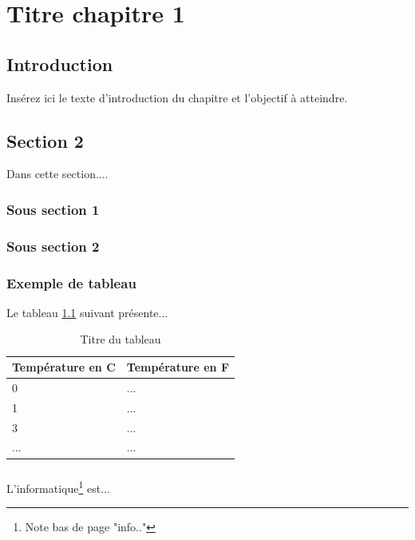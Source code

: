 \chapter{Titre chapitre 1}

\section{Introduction}
Insérez ici le texte d’introduction du chapitre et l’objectif à atteindre.



\section{Section 2}
Dans cette section....
\subsection{Sous section 1}

\subsection{Sous section 2}
\subsection{Exemple de tableau}
Le tableau \ref{tab:titretableau} suivant présente...
\begin{table}[h]
	\begin{center}
		\begin{tabular}{|l|l|}
			\hline
			\textbf{Température en C} & \textbf{Température en F} \\
			\hline
			\hline
			0 & ... \\
			\hline
			1 & ... \\
			\hline
			3 & ... \\
			\hline
			... & ... \\
			\hline
		\end{tabular}
	\end{center}
	\caption{Titre du tableau}
	\label{tab:titretableau}
\end{table}

\paragraph{}
L'informatique\footnote{Note bas de page "info.."} est...

